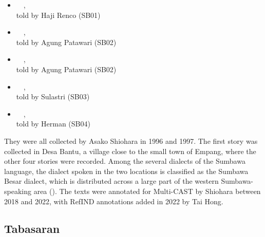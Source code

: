 \begin{itemize}
	\TabPositions{5em}
	\item	{}		\tab	{}~~,\\\hspace*{1em}\tab told by Haji Renco (SB01)
	\item	{}	\tab	{}~~,\\\hspace*{1em}\tab told by Agung Patawari (SB02)
	\item	{}		\tab	{}~~,\\\hspace*{1em}\tab told by Agung Patawari (SB02)
	\item	{}	\tab	{}~~,\\\hspace*{1em}\tab told by Sulastri (SB03)
	\item	{}		\tab	{}~~,\\\hspace*{1em}\tab told by Herman (SB04)
\end{itemize}
%
They were all collected by Asako Shiohara in 1996 and 1997. The first story was collected in Desa Bantu, a village close to the small town of Empang, where the other four stories were recorded. Among the several dialects of the Sumbawa language, the dialect spoken in the two locations is classiﬁed as the Sumbawa Besar dialect, which is distributed across a large part of the western Sumbawa-speaking area ().
%
The texts were annotated for Multi-CAST by Shiohara between 2018 and 2022, with RefIND annotations added in 2022 by Tai Hong.



\subsection{Tabasaran}
\label{ssec:corpus-tabasaran}

